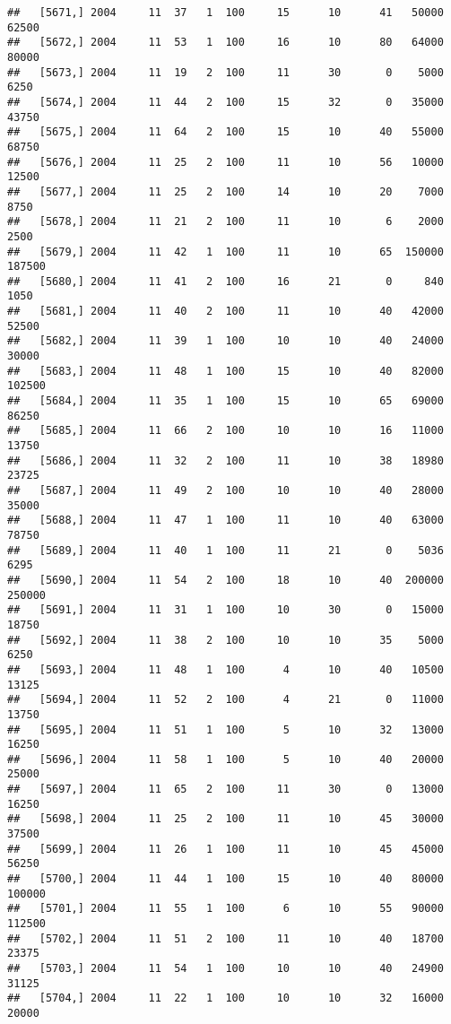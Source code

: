 \documentclass{article}\usepackage[]{graphicx}\usepackage[]{color}
\makeatletter
\newenvironment{kframe}{%
 \def\at@end@of@kframe{}%
 \ifinner\ifhmode%
  \def\at@end@of@kframe{\end{minipage}}%
  \begin{minipage}{\columnwidth}%
 \fi\fi%
 \def\FrameCommand##1{\hskip\@totalleftmargin \hskip-\fboxsep
 \colorbox{shadecolor}{##1}\hskip-\fboxsep
     \hskip-\linewidth \hskip-\@totalleftmargin \hskip\columnwidth}%
 \MakeFramed {\advance\hsize-\width
   \@totalleftmargin\z@ \linewidth\hsize
   \@setminipage}}%
 {\par\unskip\endMakeFramed%
 \at@end@of@kframe}
\newenvironment{knitrout}{}{} %
\makeatother
\begin{document}
\begin{knitrout}
\begin{kframe}
\begin{verbatim}
##   [5671,] 2004     11  37   1  100     15      10      41   50000   62500
##   [5672,] 2004     11  53   1  100     16      10      80   64000   80000
##   [5673,] 2004     11  19   2  100     11      30       0    5000    6250
##   [5674,] 2004     11  44   2  100     15      32       0   35000   43750
##   [5675,] 2004     11  64   2  100     15      10      40   55000   68750
##   [5676,] 2004     11  25   2  100     11      10      56   10000   12500
##   [5677,] 2004     11  25   2  100     14      10      20    7000    8750
##   [5678,] 2004     11  21   2  100     11      10       6    2000    2500
##   [5679,] 2004     11  42   1  100     11      10      65  150000  187500
##   [5680,] 2004     11  41   2  100     16      21       0     840    1050
##   [5681,] 2004     11  40   2  100     11      10      40   42000   52500
##   [5682,] 2004     11  39   1  100     10      10      40   24000   30000
##   [5683,] 2004     11  48   1  100     15      10      40   82000  102500
##   [5684,] 2004     11  35   1  100     15      10      65   69000   86250
##   [5685,] 2004     11  66   2  100     10      10      16   11000   13750
##   [5686,] 2004     11  32   2  100     11      10      38   18980   23725
##   [5687,] 2004     11  49   2  100     10      10      40   28000   35000
##   [5688,] 2004     11  47   1  100     11      10      40   63000   78750
##   [5689,] 2004     11  40   1  100     11      21       0    5036    6295
##   [5690,] 2004     11  54   2  100     18      10      40  200000  250000
##   [5691,] 2004     11  31   1  100     10      30       0   15000   18750
##   [5692,] 2004     11  38   2  100     10      10      35    5000    6250
##   [5693,] 2004     11  48   1  100      4      10      40   10500   13125
##   [5694,] 2004     11  52   2  100      4      21       0   11000   13750
##   [5695,] 2004     11  51   1  100      5      10      32   13000   16250
##   [5696,] 2004     11  58   1  100      5      10      40   20000   25000
##   [5697,] 2004     11  65   2  100     11      30       0   13000   16250
##   [5698,] 2004     11  25   2  100     11      10      45   30000   37500
##   [5699,] 2004     11  26   1  100     11      10      45   45000   56250
##   [5700,] 2004     11  44   1  100     15      10      40   80000  100000
##   [5701,] 2004     11  55   1  100      6      10      55   90000  112500
##   [5702,] 2004     11  51   2  100     11      10      40   18700   23375
##   [5703,] 2004     11  54   1  100     10      10      40   24900   31125
##   [5704,] 2004     11  22   1  100     10      10      32   16000   20000

\end{verbatim}
\end{kframe}
\end{knitrout}
\end{document}
